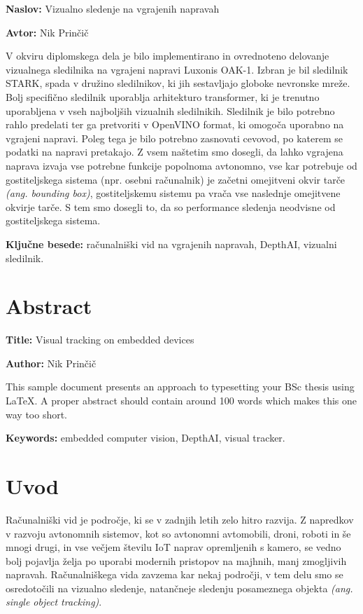 \documentclass[a4paper,12pt,openright]{book}
\newcommand{\ttitle}{Vizualno sledenje na vgrajenih napravah}
\newcommand{\ttitleEn}{Visual tracking on embedded devices}
\newcommand{\tauthor}{Nik Prinčič}
\newcommand{\tkeywords}{računalniški vid na vgrajenih napravah, DepthAI, vizualni sledilnik}
\newcommand{\tkeywordsEn}{embedded computer vision, DepthAI, visual tracker}
\newcommand{\clearemptydoublepage}{\newpage{\pagestyle{empty}\cleardoublepage}}
\begin{document}
\noindent\textbf{Naslov:} \ttitle
\bigskip

\noindent\textbf{Avtor:} \tauthor
\bigskip

\noindent V okviru diplomskega dela je bilo implementirano in ovrednoteno delovanje vizualnega sledilnika na vgrajeni napravi Luxonis OAK-1. Izbran je bil sledilnik STARK, spada v družino sledilnikov, ki jih sestavljajo globoke nevronske mreže. Bolj specifično sledilnik uporablja arhitekturo transformer, ki je trenutno uporabljena v vseh najboljših vizualnih sledilnikih. Sledilnik je bilo potrebno rahlo predelati ter ga pretvoriti v OpenVINO format, ki omogoča uporabno na vgrajeni napravi. Poleg tega je bilo potrebno zasnovati cevovod, po katerem se podatki na napravi pretakajo. Z vsem naštetim smo dosegli, da lahko vgrajena naprava izvaja vse potrebne funkcije popolnoma avtonomno, vse kar potrebuje od gostiteljskega sistema (npr. osebni računalnik) je začetni omejitveni okvir tarče \emph{(ang. bounding box)}, gostiteljskemu sistemu pa vrača vse naslednje omejitvene okvirje tarče. S tem smo dosegli to, da so performance sledenja neodvisne od gostiteljskega sistema.
\bigskip

\noindent\textbf{Ključne besede:} \tkeywords.
\clearemptydoublepage

\chapter*{Abstract}

\noindent\textbf{Title:} \ttitleEn
\bigskip

\noindent\textbf{Author:} \tauthor
\bigskip

\noindent This sample document presents an approach to typesetting your BSc thesis using \LaTeX.
A proper abstract should contain around 100 words which makes this one way too short.
\bigskip

\noindent\textbf{Keywords:} \tkeywordsEn.
\clearemptydoublepage

\mainmatter
\setcounter{page}{1}
\pagestyle{fancy}

\chapter{Uvod}
Računalniški vid je področje, ki se v zadnjih letih zelo hitro razvija. Z napredkov v razvoju avtonomnih sistemov, kot so avtonomni avtomobili, droni, roboti in še mnogi drugi, in vse večjem številu IoT naprav opremljenih s kamero, se vedno bolj pojavlja želja po uporabi modernih pristopov na majhnih, manj zmogljivih napravah. Računalniškega vida zavzema kar nekaj področji, v tem delu smo se osredotočili na vizualno sledenje, natančneje sledenju posameznega objekta \emph{(ang. single object tracking)}.
\end{document}
